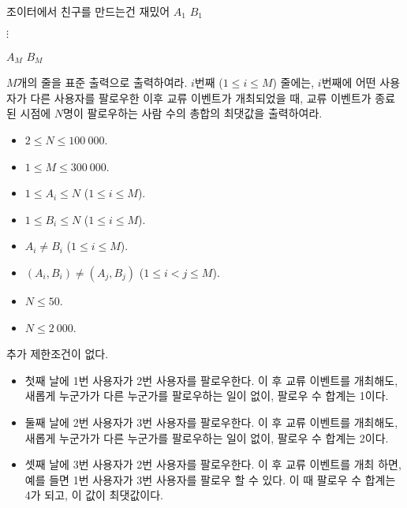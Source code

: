 \begin{problem}{조이터에서 친구를 만드는건 재밌어}
$A_1$ $B_1$

$\vdots$

$A_M$ $B_M$

\OutputFile

$M$개의 줄을 표준 출력으로 출력하여라. $i$번째 ($1 \le i \le M$) 줄에는, $i$번째에 어떤 사용자가 다른 사용자를 팔로우한 이후 교류 이벤트가 개최되었을 때, 교류 이벤트가 종료된 시점에 $N$명이 팔로우하는 사람 수의 총합의 최댓값을 출력하여라.

\Constraints

\begin{itemize}
	\item $2 \le N \le 100\ 000$.
	\item $1 \le M \le 300\ 000$.
	\item $1 \le A_i \le N$ ($1 \le i \le M$).
	\item $1 \le B_i \le N$ ($1 \le i \le M$).
	\item $A_i \ne B_i$ ($1 \le i \le M$).
	\item $(A_i, B_i) \ne (A_j, B_j)$ ($1 \le i < j \le M$).
\end{itemize}


\begin{itemize}
	\item $N \le 50$.
\end{itemize}

\begin{itemize}
	\item $N \le 2\ 000$.
\end{itemize}


추가 제한조건이 없다.

\Examples

\begin{example}
\end{example}

\begin{itemize}
\item 첫째 날에 1번 사용자가 2번 사용자를 팔로우한다. 이 후 교류 이벤트를 개최해도, 새롭게 누군가가 다른 누군가를 팔로우하는 일이 없이, 팔로우 수 합계는 1이다.
\item 둘째 날에 2번 사용자가 3번 사용자를 팔로우한다. 이 후 교류 이벤트를 개최해도, 새롭게 누군가가 다른 누군가를 팔로우하는 일이 없이, 팔로우 수 합계는 2이다.
\item 셋째 날에 3번 사용자가 2번 사용자를 팔로우한다. 이 후 교류 이벤트를 개최 하면, 예를 들면 1번 사용자가 3번 사용자를 팔로우 할 수 있다. 이 때 팔로우 수 합계는 4가 되고, 이 값이 최댓값이다.


\end{itemize}
\end{problem}

